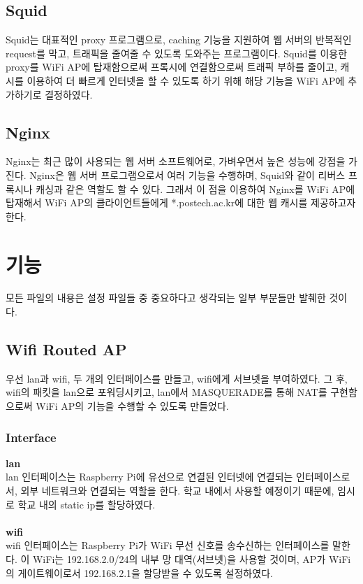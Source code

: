\documentclass{article}
\begin{document}
    \subsection{Squid}
    Squid는 대표적인 proxy 프로그램으로, caching 기능을 지원하여 웹 서버의 반복적인 request를 막고, 트래픽을 줄여줄 수 있도록 도와주는 프로그램이다.
    Squid를 이용한 proxy를 WiFi AP에 탑재함으로써 프록시에 연결함으로써 트래픽 부하를 줄이고, 캐시를 이용하여 더 빠르게 인터넷을 할 수 있도록 하기 위해
    해당 기능을 WiFi AP에 추가하기로 결정하였다.
    \subsection{Nginx}
    Nginx는 최근 많이 사용되는 웹 서버 소프트웨어로, 가벼우면서 높은 성능에 강점을 가진다. Nginx은 웹 서버 프로그램으로서 여러 기능을 수행하며, Squid와 같이
    리버스 프록시나 캐싱과 같은 역할도 할 수 있다. 그래서 이 점을 이용하여 Nginx를 WiFi AP에 탑재해서
    WiFi AP의 클라이언트들에게 *.postech.ac.kr에 대한 웹 캐시를 제공하고자 한다.
    \section{기능}
    모든 파일의 내용은 설정 파일들 중 중요하다고 생각되는 일부 부분들만 발췌한 것이다.
    \subsection{Wifi Routed AP}
    우선 lan과 wifi, 두 개의 인터페이스를 만들고, wifi에게 서브넷을 부여하였다. 그 후, wifi의 패킷을 lan으로 포워딩시키고,
    lan에서 MASQUERADE를 통해 NAT를 구현함으로써 WiFi AP의 기능을 수행할 수 있도록 만들었다.
    \subsubsection{Interface}
    \textbf{lan}\\
    lan 인터페이스는 Raspberry Pi에 유선으로 연결된 인터넷에 연결되는 인터페이스로서, 외부 네트워크와 연결되는 역할을 한다.
    학교 내에서 사용할 예정이기 때문에, 임시로 학교 내의 static ip를 할당하였다. \\ \\
    \textbf{wifi}\\
    wifi 인터페이스는 Raspberry Pi가 WiFi 무선 신호를 송수신하는 인터페이스를 말한다. 이 WiFi는 192.168.2.0/24의 내부 망 대역(서브넷)을 사용할 것이며,
    AP가 WiFi의 게이트웨이로서 192.168.2.1을 할당받을 수 있도록 설정하였다.
\end{document}

